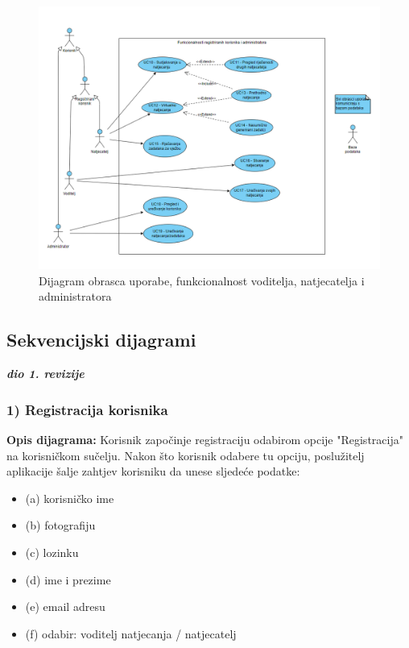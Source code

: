 					\begin{figure}[H]
						\includegraphics[scale=0.4]{slike/Uml - obrasci uporabe 2}
						\centering
						\caption{Dijagram obrasca uporabe, funkcionalnost voditelja, natjecatelja i administratora}
						\label{fig:dijagram2}
					\end{figure}
					
				\eject		
				
			\subsection{Sekvencijski dijagrami}
				
				\textbf{\textit{dio 1. revizije}}\
							
				
				\subsubsection{1) Registracija korisnika}
				
				\textbf{Opis dijagrama:}
				Korisnik započinje registraciju odabirom opcije "Registracija" na korisničkom sučelju. Nakon što korisnik odabere tu opciju, poslužitelj aplikacije šalje zahtjev korisniku da unese sljedeće podatke:
				
				\begin{itemize}
					\item (a) korisničko ime
					\item (b) fotografiju
					\item (c) lozinku
					\item (d) ime i prezime
					\item (e) email adresu
					\item (f) odabir: voditelj natjecanja / natjecatelj
				\end{itemize}
				
